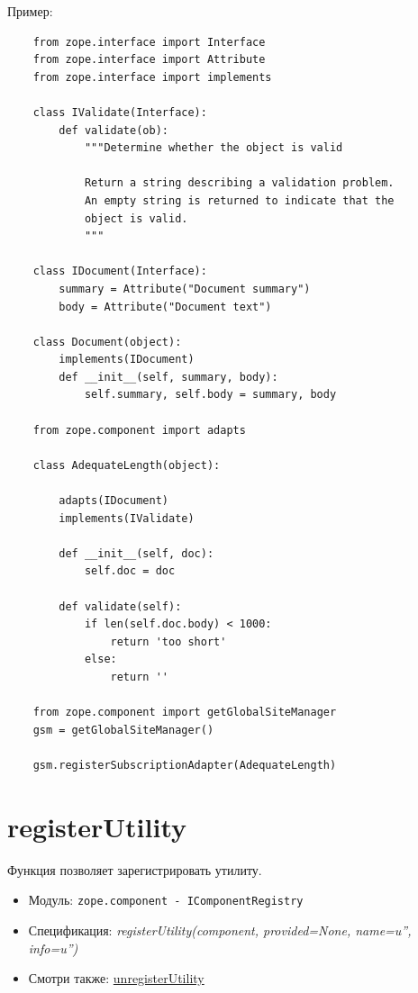 \documentclass[a4paper,openany,twoside,final]{book}
\providecommand*{\DUroletitlereference}[1]{\textsl{#1}}
\begin{document}
Пример:

\begin{verbatim}
    from zope.interface import Interface
    from zope.interface import Attribute
    from zope.interface import implements

    class IValidate(Interface):
        def validate(ob):
            """Determine whether the object is valid

            Return a string describing a validation problem.
            An empty string is returned to indicate that the
            object is valid.
            """

    class IDocument(Interface):
        summary = Attribute("Document summary")
        body = Attribute("Document text")

    class Document(object):
        implements(IDocument)
        def __init__(self, summary, body):
            self.summary, self.body = summary, body

    from zope.component import adapts

    class AdequateLength(object):

        adapts(IDocument)
        implements(IValidate)

        def __init__(self, doc):
            self.doc = doc

        def validate(self):
            if len(self.doc.body) < 1000:
                return 'too short'
            else:
                return ''

    from zope.component import getGlobalSiteManager
    gsm = getGlobalSiteManager()

    gsm.registerSubscriptionAdapter(AdequateLength)
\end{verbatim}


\section*{registerUtility%
  \label{registerutility}%
}

Функция позволяет зарегистрировать утилиту.

\begin{itemize}

\item Модуль: \texttt{zope.component - IComponentRegistry}

\item Спецификация: \DUroletitlereference{registerUtility(component, provided=None, name=u'', info=u'')}

\item Смотри также: \hyperref[unregisterutility]{unregisterUtility}

\end{itemize}
\end{document}
